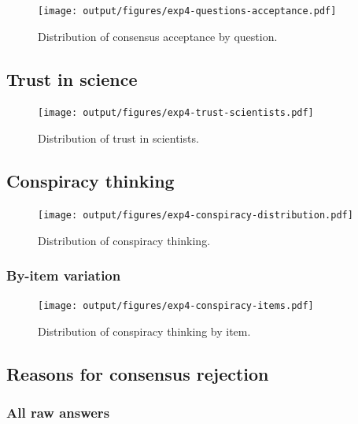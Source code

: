 \documentclass[
  doc,floatsintext]{apa6}
\begin{document}
\begin{figure}
\centering
\texttt{[image: output/figures/exp4-questions-acceptance.pdf]}
\caption{\label{fig:exp4-questions-acceptance}Distribution of consensus acceptance by question.}
\end{figure}

\subsection{Trust in science}\label{trust-in-science-9}



\begin{figure}
\centering
\texttt{[image: output/figures/exp4-trust-scientists.pdf]}
\caption{\label{fig:exp4-trust-scientists}Distribution of trust in scientists.}
\end{figure}

\subsection{Conspiracy thinking}\label{conspiracy-thinking-4}



\begin{figure}
\centering
\texttt{[image: output/figures/exp4-conspiracy-distribution.pdf]}
\caption{\label{fig:exp4-conspiracy-distribution}Distribution of conspiracy thinking.}
\end{figure}

\subsubsection{By-item variation}\label{by-item-variation-3}



\begin{figure}
\centering
\texttt{[image: output/figures/exp4-conspiracy-items.pdf]}
\caption{\label{fig:exp4-conspiracy-items}Distribution of conspiracy thinking by item.}
\end{figure}

\subsection{Reasons for consensus rejection}\label{reasons-for-consensus-rejection-2}

\subsubsection{All raw answers}\label{all-raw-answers-2}
\end{document}
